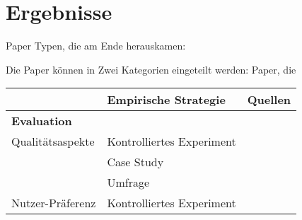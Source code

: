 \pagebreak

\section{Ergebnisse}
Paper Typen, die am Ende herauskamen:

Die Paper können in Zwei Kategorien eingeteilt werden: Paper, die 

\begin{longtable}{|p{}p{}p{}|}
    \hline
     & \textbf{Empirische Strategie} & \textbf{Quellen} \\ \hline
     \textbf{Evaluation} & & \\
    Qualitätsaspekte                                                                &
    Kontrolliertes Experiment                                                       &
         \cite{tintarev_designing_nodate} \cite{sato_context_nodate} \cite{eiband_impact_2019} \cite{tsai_evaluating_2019} \cite{hernandez-bocanegra_effects_2020} \cite{balog_measuring_2020} \cite{kunkel_let_2019} \cite{schaffer_i_2019} \cite{weitz_you_2019} \cite{yamada_evaluating_2016} \cite{sato_action-triggering_2019} \cite{haspiel_explanations_2018} \cite{zahedi_towards_2019} \cite{zolotas_towards_2019} \cite{riveiro_thats_2021}  \cite{martin_evaluating_2021} \cite{tsai_effects_2020}    \cite{neerincx_using_2018} \cite{schrills_color_2020} \cite{wang_is_2018} \cite{zhu_effects_2020} \cite{koo_why_2015} \cite{koo_understanding_2016} \cite{cheng2019explaining}
         \\
                                                                                    &
    Case Study                                                                      &
         \cite{martin_developing_2019} \cite{ehsan_human-centered_2020}
         \\
                                                                                    &
    Umfrage                                                                         &
        \cite{chazette_end-users_nodate} \cite{chazette2020explainability} \cite{sokol_one_2020}
    \\
    Nutzer-Präferenz                                                                &
    Kontrolliertes Experiment                                                       &
        \cite{kouki_user_2017} \cite{mucha_interfaces_2021} \cite{abdulrahman_belief-based_2019} \cite{waa_evaluating_2021} \cite{wiegand_id_2020} \cite{stange_effects_2021} \cite{kaptein_personalised_2017} \cite{wiegand2019drive}

\end{longtable}

